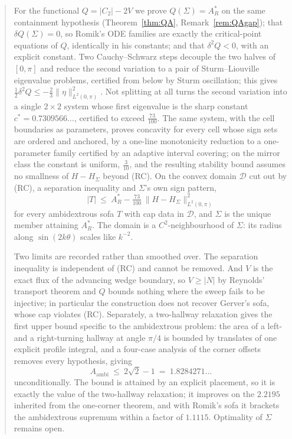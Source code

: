 \documentclass[11pt]{article}
\theoremstyle{definition}
\newcommand{\Sig}{\Sigma}
\begin{document}
\begin{abstract}
For the functional $Q=|C_2|-2V$ we prove $Q(\Sig)=A_R^\ast$ on the same containment
hypothesis (Theorem~\ref{thm:QA}, Remark~\ref{rem:QAgap}); that $\delta Q(\Sig)=0$, so
Romik's ODE families are exactly the critical-point equations of $Q$, identically in his
constants; and that $\delta^2Q<0$, with an explicit constant. Two Cauchy--Schwarz steps
decouple the two halves of $[0,\pi]$ and reduce the second variation to a pair of
Sturm--Liouville eigenvalue problems, certified from below by Sturm oscillation; this
gives $\tfrac12\delta^2Q\le-\tfrac23\|\eta\|^2_{L^2(0,\pi)}$. Not splitting at all
turns the second variation into a single $2\times2$ system whose first eigenvalue is the
sharp constant $c^\ast=0.7309566\ldots$, certified to exceed $\tfrac{73}{100}$. The same
system, with the cell boundaries as parameters, proves concavity for every cell whose
sign sets are ordered and anchored, by a one-line monotonicity reduction to a
one-parameter family certified by an adaptive interval covering; on the mirror class the
constant is uniform, $\tfrac3{10}$, and the resulting stability bound assumes no
smallness of $H-H_\Sig$ beyond (RC). On the
convex domain $\mathcal D$ cut out by (RC), a separation inequality and $\Sig$'s own sign
pattern,
\[
  |T|\ \le\ A_R^\ast-\tfrac{73}{100}\,\|H-H_\Sig\|^2_{L^2(0,\pi)}
\]
for every ambidextrous sofa $T$ with cap data in $\mathcal D$, and $\Sig$ is the unique
member attaining $A_R^\ast$. The domain is a $C^2$-neighbourhood of $\Sig$: its radius
along $\sin(2k\theta)$ scales like $k^{-2}$.

Two limits are recorded rather than smoothed over. The separation inequality is
independent of (RC) and cannot be removed. And $V$ is the exact flux of the advancing
wedge boundary, so $V\ge|N|$ by Reynolds' transport theorem and $Q$ bounds nothing where
the sweep fails to be injective; in particular the construction does not recover Gerver's
sofa, whose cap violates (RC). Separately, a two-hallway relaxation gives the first
upper bound specific to the ambidextrous problem: the area of a left- and a right-turning
hallway at angle $\pi/4$ is bounded by translates of one explicit profile integral, and a
four-case analysis of the corner offsets removes every hypothesis, giving
\[
  A_{\mathrm{ambi}}\ \le\ 2\sqrt2-1\ =\ 1.8284271\ldots
\]
unconditionally. The bound is attained by an explicit placement, so it is exactly the
value of the two-hallway relaxation; it improves on the $2.2195$ inherited from the
one-corner theorem, and with Romik's sofa it brackets the ambidextrous supremum within a
factor of $1.1115$. Optimality of $\Sig$ remains open.
\end{abstract}
\end{document}
